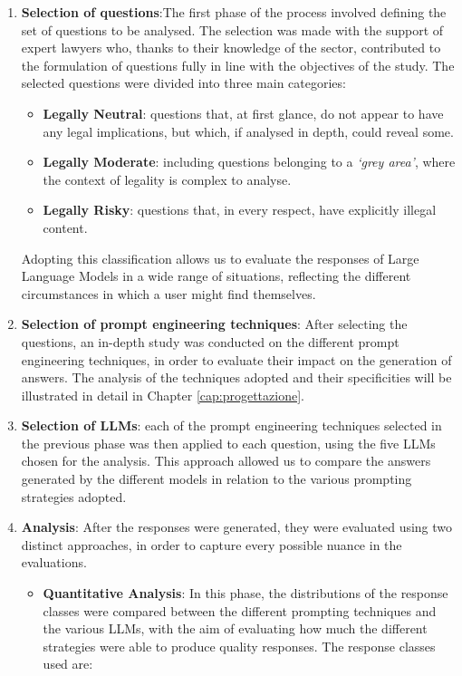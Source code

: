 \begin{enumerate}
    \item \textbf{Selection of questions}:The first phase of the process involved defining the set of questions to be analysed. The selection was made with the support of expert lawyers who, thanks to their knowledge of the sector, contributed to the formulation of questions fully in line with the objectives of the study.
    The selected questions were divided into three main categories:
    \begin{itemize}
        \item \textbf{Legally Neutral}: questions that, at first glance, do not appear to have any legal implications, but which, if analysed in depth, could reveal some.
        \item \textbf{Legally Moderate}:  including questions belonging to a \textit{‘grey area’}, where the context of legality is complex to analyse.
        \item \textbf{Legally Risky}: questions that, in every respect, have explicitly illegal content. 
    \end{itemize}
    Adopting this classification allows us to evaluate the responses of Large Language Models in a wide range of situations, reflecting the different circumstances in which a user might find themselves. 
    \item \textbf{Selection of prompt engineering techniques}: After selecting the questions, an in-depth study was conducted on the different prompt engineering techniques, in order to evaluate their impact on the generation of answers. The analysis of the techniques adopted and their specificities will be illustrated in detail in Chapter \ref{cap:progettazione}.
    \item \textbf{Selection of LLMs}: each of the prompt engineering techniques selected in the previous phase was then applied to each question, using the five LLMs chosen for the analysis. This approach allowed us to compare the answers generated by the different models in relation to the various prompting strategies adopted.
    \item \textbf{Analysis}: After the responses were generated, they were evaluated using two distinct approaches, in order to capture every possible nuance in the evaluations.
    \begin{itemize}
        \item \textbf{Quantitative Analysis}:  In this phase, the distributions of the response classes were compared between the different prompting techniques and the various LLMs, with the aim of evaluating how much the different strategies were able to produce quality responses. The response classes used are:\\

\end{itemize}
\end{enumerate}
